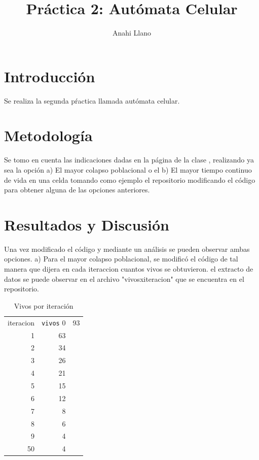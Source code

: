 \documentclass{article}
\title{Pr\'actica 2: Aut\'omata Celular}
\author{Anahi Llano}
\begin{document}
\maketitle

\section{Introducci\'{o}n}\label{into}

Se realiza la segunda p\'ractica \cite{elisa} llamada aut\'omata celular.
 
\section{Metodolog\'{i}a}\label{met}

Se tomo en cuenta las indicaciones dadas en la p\'{a}gina de la clase \cite{elisa}, realizando ya sea la opci\'on a) El mayor colapso poblacional o el b) El mayor tiempo continuo de vida en una celda tomando como ejemplo el repositorio \cite{SatuElisa} modificando el c\'odigo para obtener alguna de las opciones anteriores.

\section{Resultados y Discusi\'{o}n}\label{res}

Una vez modificado el c\'odigo y mediante un an\'alisis se pueden observar ambas opciones.
a) Para el mayor colapso poblacional, se modific\'o el c\'odigo de tal manera que dijera en cada iteraccion cuantos vivos se obtuvieron. \cite{ana} el extracto de datos se puede observar en el archivo "vivosxiteracion" que se encuentra en el repositorio.

\begin{table}
  \caption{Vivos por iteraci\'on}
  \label{t1}
  \begin{center}
    \begin{tabular}{rrr}
      iteracion & \texttt{vivos}
      0 &  93        \\
      1 &  63        \\
      2 &  34       \\
      3 &  26    \\
      4 &  21  \\
      5 &  15 \\
      6 &  12 \\ 
      7 &  8   \\
      8 &  6  \\
      9 &  4  \\
      50 &  4  

\end{tabular}
\end{center}
\end{table}
  
\end{document}
